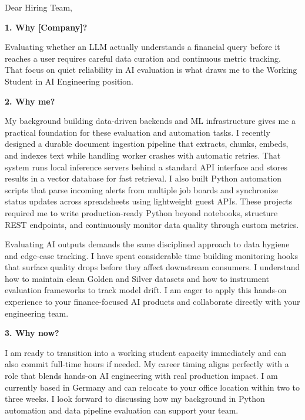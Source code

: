 \documentclass[11pt,a4paper]{coverletter}
\begin{document}

\opening{Dear Hiring Team,}

\vspace{8pt}\noindent\textbf{1. Why [Company]?}\par\vspace{3pt}

Evaluating whether an LLM actually understands a financial query before it reaches a user requires careful data curation and continuous metric tracking. That focus on quiet reliability in AI evaluation is what draws me to the Working Student in AI Engineering position.

\vspace{8pt}\noindent\textbf{2. Why me?}\par\vspace{3pt}

My background building data-driven backends and ML infrastructure gives me a practical foundation for these evaluation and automation tasks. I recently designed a durable document ingestion pipeline that extracts, chunks, embeds, and indexes text while handling worker crashes with automatic retries. That system runs local inference servers behind a standard API interface and stores results in a vector database for fast retrieval. I also built Python automation scripts that parse incoming alerts from multiple job boards and synchronize status updates across spreadsheets using lightweight guest APIs. These projects required me to write production-ready Python beyond notebooks, structure REST endpoints, and continuously monitor data quality through custom metrics.

Evaluating AI outputs demands the same disciplined approach to data hygiene and edge-case tracking. I have spent considerable time building monitoring hooks that surface quality drops before they affect downstream consumers. I understand how to maintain clean Golden and Silver datasets and how to instrument evaluation frameworks to track model drift. I am eager to apply this hands-on experience to your finance-focused AI products and collaborate directly with your engineering team.

\vspace{8pt}\noindent\textbf{3. Why now?}\par\vspace{3pt}

I am ready to transition into a working student capacity immediately and can also commit full-time hours if needed. My career timing aligns perfectly with a role that blends hands-on AI engineering with real production impact. I am currently based in Germany and can relocate to your office location within two to three weeks. I look forward to discussing how my background in Python automation and data pipeline evaluation can support your team.
\end{document}
